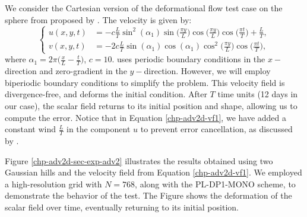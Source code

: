 We consider the Cartesian version of the deformational flow test case on the sphere from \citet{nair:2010}
proposed by \citet{chen:2017}. The velocity is given by:
\begin{equation}
	\label{chp-adv2d-vf1}
	\begin{cases}
		u(x,y,t) &= -c\frac{L}{T} \sin^2(\alpha_1)\sin\big(\frac{\pi y}{L}\big)\cos\big(\frac{\pi y}{L}\big)  \cos\big(\frac{\pi t}{T}\big) + \frac{L}{T},\\
		v(x,y,t) &= -2c\frac{L}{T}\sin(\alpha_1)  \cos(\alpha_1)\cos^2\big(\frac{\pi y}{L}\big)\cos\big(\frac{\pi t}{T}\big),
	\end{cases}
\end{equation}
where $\alpha_1 = 2\pi\big(\frac{x}{L}-\frac{t}{T}\big)$, $c = 10$.
\citet{chen:2017} uses periodic boundary conditions in the $x-$direction and zero-gradient in the $y-$direction.
However, we will employ biperiodic boundary conditions to simplify the problem.
This velocity field is divergence-free, and deforms the initial condition.
After $T$ time units (12 days in our case), the scalar field returns to its initial position and shape, allowing us to compute the error.
Notice that in Equation \eqref{chp-adv2d-vf1}, we have added a constant wind $\frac{L}{T}$ in the component
$u$ to prevent error cancellation, as discussed by \citet{nair:2010}.

Figure \ref{chp-adv2d-sec-exp-adv2} illustrates the results obtained using two Gaussian hills and the velocity field 
from Equation \eqref{chp-adv2d-vf1}.
We employed a high-resolution grid with $N=768$, along with the PL-DP1-MONO scheme,
to demonstrate the behavior of the test.
The Figure shows the deformation of the scalar field over time, eventually returning to its initial position.

